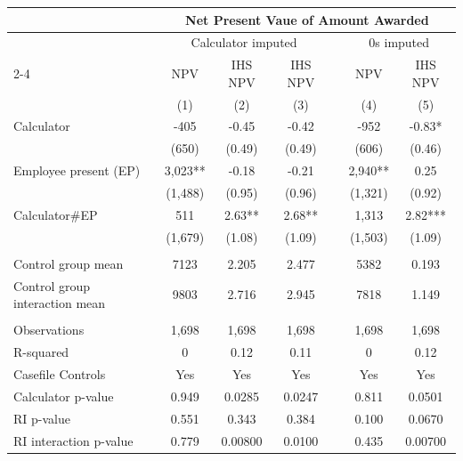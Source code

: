 \begin{tabular}{lcccccc}
\toprule
      & \multicolumn{6}{c}{Net Present Vaue of Amount Awarded} \\
\midrule
\midrule
      & \multicolumn{3}{c}{Calculator imputed} &       & \multicolumn{2}{c}{0s imputed} \\
\cmidrule{2-4}\cmidrule{6-7}      & NPV   & IHS NPV & IHS NPV &       & NPV   & IHS NPV \\
\midrule
\midrule
      & (1)   & (2)   & (3)   &       & (4)   & (5) \\
\midrule
\midrule
Calculator & -405  & -0.45 & -0.42 &       & -952  & -0.83* \\
      & (650) & (0.49) & (0.49) &       & (606) & (0.46) \\
Employee present (EP) & 3,023** & -0.18 & -0.21 &       & 2,940** & 0.25 \\
      & (1,488) & (0.95) & (0.96) &       & (1,321) & (0.92) \\
Calculator\#EP & 511   & 2.63** & 2.68** &       & 1,313 & 2.82*** \\
      & (1,679) & (1.08) & (1.09) &       & (1,503) & (1.09) \\
      &       &       &       &       &       &  \\
\midrule
Control group mean & 7123  & 2.205 & 2.477 &       & 5382  & 0.193 \\
Control group interaction mean & 9803  & 2.716 & 2.945 &       & 7818  & 1.149 \\
\midrule
      &       &       &       &       &       &  \\
\midrule
Observations & 1,698 & 1,698 & 1,698 &       & 1,698 & 1,698 \\
R-squared & 0     & 0.12  & 0.11  &       & 0     & 0.12 \\
Casefile Controls & Yes   & Yes   & Yes   &       & Yes   & Yes \\
Calculator p-value & 0.949 & 0.0285 & 0.0247 &       & 0.811 & 0.0501 \\
RI p-value & 0.551 & 0.343 & 0.384 &       & 0.100 & 0.0670 \\
RI interaction p-value & 0.779 & 0.00800 & 0.0100 &       & 0.435 & 0.00700 \\
\bottomrule
\bottomrule
\end{tabular}%
